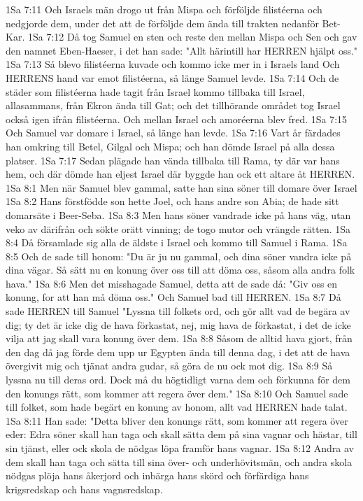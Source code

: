1Sa 7:11  Och Israels män drogo ut från Mispa och förföljde filistéerna och nedgjorde dem, under det att de förföljde dem ända till trakten nedanför Bet-Kar.
1Sa 7:12  Då tog Samuel en sten och reste den mellan Mispa och Sen och gav den namnet Eben-Haeser, i det han sade: "Allt härintill har HERREN hjälpt oss."
1Sa 7:13  Så blevo filistéerna kuvade och kommo icke mer in i Israels land Och HERRENS hand var emot filistéerna, så länge Samuel levde.
1Sa 7:14  Och de städer som filistéerna hade tagit från Israel kommo tillbaka till Israel, allasammans, från Ekron ända till Gat; och det tillhörande området tog Israel också igen ifrån filistéerna. Och mellan Israel och amoréerna blev fred.
1Sa 7:15  Och Samuel var domare i Israel, så länge han levde.
1Sa 7:16  Vart år färdades han omkring till Betel, Gilgal och Mispa; och han dömde Israel på alla dessa platser.
1Sa 7:17  Sedan plägade han vända tillbaka till Rama, ty där var hans hem, och där dömde han eljest Israel där byggde han ock ett altare åt HERREN.
1Sa 8:1  Men när Samuel blev gammal, satte han sina söner till domare över Israel
1Sa 8:2  Hans förstfödde son hette Joel, och hans andre son Abia; de hade sitt domarsäte i Beer-Seba.
1Sa 8:3  Men hans söner vandrade icke på hans väg, utan veko av därifrån och sökte orätt vinning; de togo mutor och vrängde rätten.
1Sa 8:4  Då församlade sig alla de äldste i Israel och kommo till Samuel i Rama.
1Sa 8:5  Och de sade till honom: "Du är ju nu gammal, och dina söner vandra icke på dina vägar. Så sätt nu en konung över oss till att döma oss, såsom alla andra folk hava."
1Sa 8:6  Men det misshagade Samuel, detta att de sade då: "Giv oss en konung, for att han må döma oss." Och Samuel bad till HERREN.
1Sa 8:7  Då sade HERREN till Samuel "Lyssna till folkets ord, och gör allt vad de begära av dig; ty det är icke dig de hava förkastat, nej, mig hava de förkastat, i det de icke vilja att jag skall vara konung över dem.
1Sa 8:8  Såsom de alltid hava gjort, från den dag då jag förde dem upp ur Egypten ända till denna dag, i det att de hava övergivit mig och tjänat andra gudar, så göra de nu ock mot dig.
1Sa 8:9  Så lyssna nu till deras ord. Dock må du högtidligt varna dem och förkunna för dem den konungs rätt, som kommer att regera över dem."
1Sa 8:10  Och Samuel sade till folket, som hade begärt en konung av honom, allt vad HERREN hade talat.
1Sa 8:11  Han sade: "Detta bliver den konungs rätt, som kommer att regera över eder: Edra söner skall han taga och skall sätta dem på sina vagnar och hästar, till sin tjänst, eller ock skola de nödgas löpa framför hans vagnar.
1Sa 8:12  Andra av dem skall han taga och sätta till sina över- och underhövitsmän, och andra skola nödgas plöja hans åkerjord och inbärga hans skörd och förfärdiga hans krigsredskap och hans vagnsredskap.
